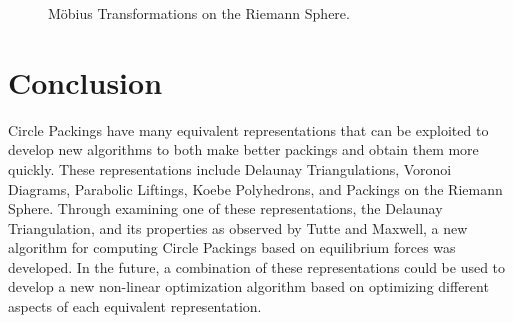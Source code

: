 \documentclass[11pt]{article}
\begin{document}
\begin{figure}[H]%
	\centering
	\qquad
	\caption[]{M\"{o}bius Transformations on the Riemann Sphere.}%
	\label{fig:mobiussphere}%
\end{figure}

\section{Conclusion}
Circle Packings have many equivalent representations that can be exploited to develop new algorithms to both make better packings and obtain them more quickly. These representations include Delaunay Triangulations, Voronoi Diagrams, Parabolic Liftings, Koebe Polyhedrons, and Packings on the Riemann Sphere. Through examining one of these representations, the Delaunay Triangulation, and its properties as observed by Tutte and Maxwell, a new algorithm for computing Circle Packings based on equilibrium forces was developed. In the future, a combination of these representations could be used to develop a new non-linear optimization algorithm based on optimizing different aspects of each equivalent representation.



\end{document}
